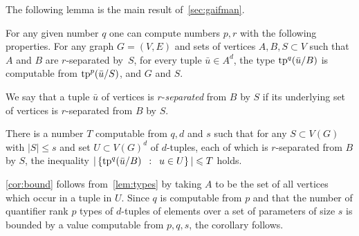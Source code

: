 The following lemma is the main result of~\cref{sec:gaifman}.




\begin{lemma}%
	\label{lem:types}
For any given number $q$
one can compute numbers $p,r$ with the following properties.	For any graph $G=(V,E)$ and sets of vertices $A,B,S\subset V$	
	such that $A$  and $B$ are $r$-separated by~$S$,
	for every tuple $\bar u\in A^{d}$, 
	the type $\mathrm{tp}^q(\bar u/B)$
	is computable from  $\mathrm{tp}^{p}(\bar u/S)$, and $G$ and $S$.
 
  
  
\end{lemma}

We say that a tuple $\bar u$ of vertices  is $r$-\emph{separated} from $B$ by $S$ if its underlying set of vertices is $r$-separated from $B$ by $S$.

\begin{corollary}\label{cor:bound}
There is a number
  $T$ computable from $q,d$ and $s$
  such that for any $S\subset V(G)$ with $|S|\le s$
    and set $U\subset V(G)^d$
  of $d$-tuples, each of which is  $r$-separated from $B$ by $S$, the inequality 
     $|\left\{\mathrm{tp}^q(\bar u/B) \,~:~\, u\in U \right\}|\leqslant T$ holds.
\end{corollary}

\cref{cor:bound}  follows from~\cref{lem:types} by taking  $A$ to be
the set of all vertices which occur in a tuple in $U$.
Since $q$ is computable from $p$
and that the number of quantifier rank $p$ types of $d$-tuples of elements over a set of parameters of  size $s$ is bounded by a value computable from $p,q,s$, the corollary follows. 




